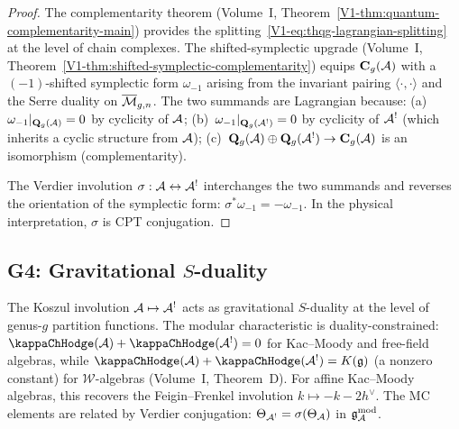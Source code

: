 \begin{proof}
The complementarity theorem (Volume~I, Theorem~\ref{V1-thm:quantum-complementarity-main})
provides the splitting~\eqref{V1-eq:thqg-lagrangian-splitting} at the level
of chain complexes. The shifted-symplectic upgrade
(Volume~I, Theorem~\ref{V1-thm:shifted-symplectic-complementarity}) equips
$\mathbf{C}_g(\mathcal{A})$ with a $(-1)$-shifted symplectic form $\omega_{-1}$
arising from the invariant pairing $\langle\cdot,\cdot\rangle$ and the
Serre duality on $\overline{\mathcal M}_{g,n}$. The two summands are Lagrangian because:
(a)~$\omega_{-1}|_{\mathbf{Q}_g(\mathcal{A})} = 0$ by cyclicity of $\mathcal{A}$;
(b)~$\omega_{-1}|_{\mathbf{Q}_g(\mathcal{A}^!)} = 0$ by cyclicity of $\mathcal{A}^!$
(which inherits a cyclic structure from $\mathcal{A}$);
(c)~$\mathbf{Q}_g(\mathcal{A}) \oplus \mathbf{Q}_g(\mathcal{A}^!) \to \mathbf{C}_g(\mathcal{A})$
is an isomorphism (complementarity).

The Verdier involution $\sigma: \mathcal{A} \leftrightarrow \mathcal{A}^!$ interchanges
the two summands and reverses the orientation of the symplectic form:
$\sigma^*\omega_{-1} = -\omega_{-1}$. In the physical interpretation,
$\sigma$ is CPT conjugation.
\end{proof}


\subsection{G4: Gravitational $S$-duality}

\begin{theorem}
The Koszul involution $\mathcal{A} \mapsto \mathcal{A}^!$ acts as gravitational $S$-duality
at the level of genus-$g$ partition functions. The modular characteristic
is duality-constrained: $\kappaChHodge(\cA) + \kappaChHodge(\cA^!) = 0$ for Kac--Moody and free-field algebras, while $\kappaChHodge(\cA) + \kappaChHodge(\cA^!) = K(\fg)$ (a nonzero constant) for $\mathcal{W}$-algebras (Volume~I, Theorem~D).
For affine Kac--Moody algebras, this recovers the Feigin--Frenkel involution
$k \mapsto -k - 2h^\vee$. The MC elements are related by Verdier conjugation:
$\Theta_{\mathcal{A}^!} = \sigma(\Theta_{\mathcal{A}})$ in $\mathfrak{g}_{\mathcal{A}}^{\mathrm{mod}}$.
\end{theorem}

